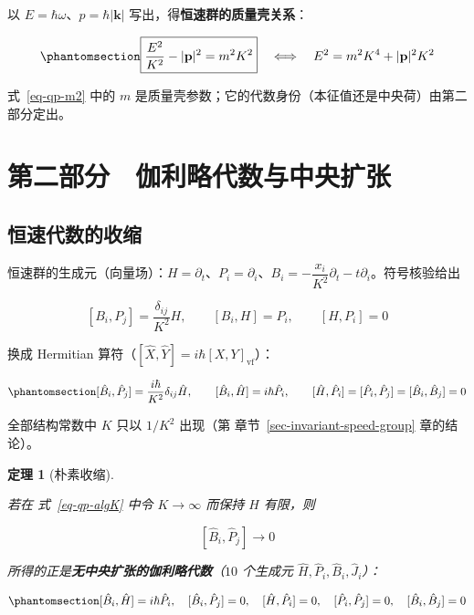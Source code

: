 \documentclass[
  chinese,
  a4paper,
  UTF8,
  12pt,
  oneside,
  openany]{ctexbook}
\theoremstyle{plain}
\newtheorem{theorem}{定理}[chapter]
\theoremstyle{plain}
\theoremstyle{plain}
\theoremstyle{definition}
\theoremstyle{plain}
\theoremstyle{plain}
\theoremstyle{remark}
\begin{document}
以 \(E=\hbar\omega\)、\(p=\hbar\lvert\mathbf{k}\rvert\)
写出，得\textbf{恒速群的质量壳关系}：

\begin{equation}\protect\phantomsection\label{eq-qp-m2}{
\boxed{\frac{E^{2}}{K^{2}}-\lvert\mathbf{p}\rvert^{2}=m^{2}K^{2}}
\quad\Longleftrightarrow\quad
E^{2}=m^{2}K^{4}+\lvert\mathbf{p}\rvert^{2}K^{2}
}\end{equation}

式~\ref{eq-qp-m2} 中的 \(m\)
是质量壳参数；它的代数身份（本征值还是中央荷）由第二部分定出。

\section{第二部分　伽利略代数与中央扩张}\label{sec-qp-part2}

\subsection{恒速代数的收缩}\label{ux6052ux901fux4ee3ux6570ux7684ux6536ux7f29}

恒速群的生成元（向量场）：\(H=\partial_t\)、\(P_i=\partial_i\)、\(B_i=-\dfrac{x_i}{K^{2}}\partial_t-t\partial_i\)。符号核验给出

\[
[B_i,P_j]=\frac{\delta_{ij}}{K^{2}}H,\qquad [B_i,H]=P_i,\qquad [H,P_i]=0
\]

换成 Hermitian 算符（\([\hat X,\hat Y]=i\hbar[X,Y]_{\text{vf}}\)）：

\begin{equation}\protect\phantomsection\label{eq-qp-algK}{
[\hat B_i,\hat P_j]=\frac{i\hbar}{K^{2}}\delta_{ij}\hat H,\qquad
[\hat B_i,\hat H]=i\hbar\hat P_i,\qquad
[\hat H,\hat P_i]=[\hat P_i,\hat P_j]=[\hat B_i,\hat B_j]=0
}\end{equation}

全部结构常数中 \(K\) 只以 \(1/K^{2}\) 出现（第
章节~\ref{sec-invariant-speed-group} 章的结论）。

\begin{theorem}[朴素收缩]\protect\hypertarget{thm-qp-contraction}{}\label{thm-qp-contraction}

若在 式~\ref{eq-qp-algK} 中令 \(K\to\infty\) 而保持 \(\hat H\) 有限，则

\[
[\hat B_i,\hat P_j]\to0
\]

所得的正是\textbf{无中央扩张的伽利略代数}（\(10\) 个生成元
\(\hat H,\hat P_i,\hat B_i,\hat J_i\)）：

\begin{equation}\protect\phantomsection\label{eq-qp-gal}{
[\hat B_i,\hat H]=i\hbar\hat P_i,\quad [\hat B_i,\hat P_j]=0,\quad
[\hat H,\hat P_i]=0,\quad [\hat P_i,\hat P_j]=0,\quad [\hat B_i,\hat B_j]=0
}\end{equation}

\end{theorem}
\end{document}
